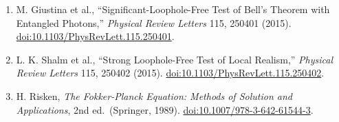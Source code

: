 \documentclass[
  american,
  11pt,
  letterpaper,
]{article}
\begin{document}
\begin{enumerate}
  B. Hensen et al., ``Loophole-Free Bell Inequality Violation Using Electron Spins Separated by 1.3 Kilometres,'' \emph{Nature} 526, 682-686 (2015). \href{https://doi.org/10.1038/nature15759}{doi:10.1038/nature15759}.
\item
  M. Giustina et al., ``Significant-Loophole-Free Test of Bell's Theorem with Entangled Photons,'' \emph{Physical Review Letters} 115, 250401 (2015). \href{https://doi.org/10.1103/PhysRevLett.115.250401}{doi:10.1103/PhysRevLett.115.250401}.
\item
  L. K. Shalm et al., ``Strong Loophole-Free Test of Local Realism,'' \emph{Physical Review Letters} 115, 250402 (2015). \href{https://doi.org/10.1103/PhysRevLett.115.250402}{doi:10.1103/PhysRevLett.115.250402}.
\item
  H. Risken, \emph{The Fokker-Planck Equation: Methods of Solution and Applications}, 2nd ed.~(Springer, 1989). \href{https://doi.org/10.1007/978-3-642-61544-3}{doi:10.1007/978-3-642-61544-3}.
\end{enumerate}
\end{document}

